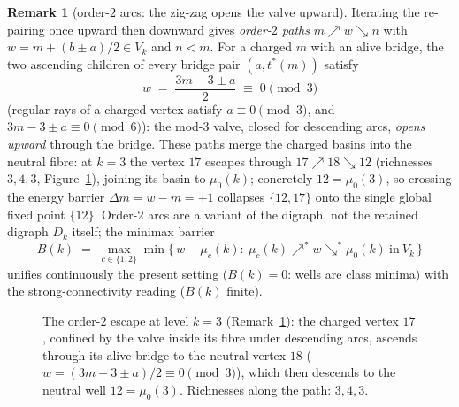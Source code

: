 \documentclass[11pt]{article}
\theoremstyle{plain}
\theoremstyle{definition}
\newtheorem{remark}[theorem]{Remark}
\newcommand{\rays}{S}
\newcommand{\rch}{r}
\newcommand{\Vk}{V_{k}}
\newcommand{\Dk}{D_{k}}
\newcommand{\tstar}{t^{\ast}}
\begin{document}
\begin{remark}[order-$2$ arcs: the zig-zag opens the valve upward]
\label{rem:zigzag}
Iterating the re-pairing once upward then downward gives
\emph{order-$2$ paths} $m \nearrow w \searrow n$ with
$w = m + (b \pm a)/2 \in \Vk$ and $n < m$. For a charged $m$ with
an alive bridge, the two ascending children of every bridge pair
$(a, \tstar(m))$ satisfy
\[
w \;=\; \frac{3m - 3 \pm a}{2} \;\equiv\; 0 \pmod 3
\]
(regular rays of a charged vertex satisfy $a \equiv 0 \pmod 3$, and
$3m - 3 \pm a \equiv 0 \pmod 6$): the mod-3 valve, closed for
descending arcs, \emph{opens upward} through the bridge. These
paths merge the charged basins into the neutral fibre: at $k = 3$
the vertex $17$ escapes through
$17 \nearrow 18 \searrow 12$ (richnesses $3,4,3$,
Figure~\ref{fig:zigzag}), joining its basin to $\mu_0(k)$;
concretely $12 = \mu_0(3)$, so crossing the energy barrier
$\Delta m = w - m = +1$ collapses $\{12, 17\}$ onto the single
global fixed point $\{12\}$. Order-$2$ arcs are a variant of the
digraph, not the retained digraph $\Dk$ itself; the minimax barrier
\[
B(k) \;=\; \max_{c \in \{1,2\}} \min\bigl\{\, w - \mu_c(k) :\
\mu_c(k) \nearrow^{\!*} w \searrow^{\!*} \mu_0(k)
\ \text{in}\ \Vk \,\bigr\}
\]
unifies continuously the present setting ($B(k) = 0$: wells are
class minima) with the strong-connectivity reading ($B(k)$
finite).
\end{remark}

\begin{figure}[htbp]
\centering
{}
\caption{The order-$2$ escape at level $k = 3$
(Remark~\ref{rem:zigzag}): the charged vertex $17$, confined by
the valve inside its fibre under descending arcs, ascends
through its alive bridge to the neutral vertex $18$
($w = (3m - 3 \pm a)/2 \equiv 0 \pmod 3$), which then descends
to the neutral well $12 = \mu_0(3)$. Richnesses along the path:
$3, 4, 3$.}
\label{fig:zigzag}
\end{figure}
\end{document}
